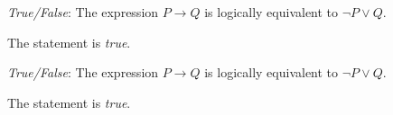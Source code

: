 \documentclass[11pt,letterpaper]{article}
\begin{document}
\thispagestyle{title}

\quizsol \textit{True/False}: The expression $P \to Q$ is logically equivalent to $\neg P \vee Q$. \pspace

\sol The statement is \textit{true}. 






\newpage



\quizsol \textit{True/False}: The expression $P \to Q$ is logically equivalent to $\neg P \vee Q$. \pspace

\sol The statement is \textit{true}. 
\end{document}
